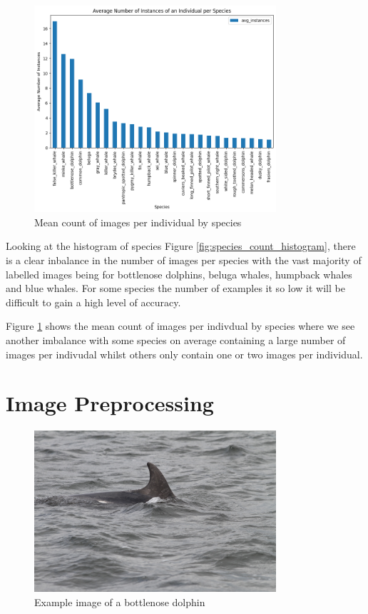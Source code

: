 \documentclass{article}
\begin{document}
\begin{figure}[!htb]
    \centering
    \includegraphics[width=0.8\textwidth]{mean_individuals_histogram.png}
    \caption{Mean count of images per individual by species}
    \label{fig:individual_mean_count_histogram}
\end{figure}

Looking at the histogram of species Figure \ref{fig:species_count_histogram}, there is a clear inbalance in the number of images per species with the vast majority
of labelled images being for bottlenose dolphins, beluga whales, humpback whales and blue whales. For some species the number of examples it so low it will be difficult to gain a high level of accuracy.

Figure \ref{fig:individual_mean_count_histogram} shows the mean count of images per indivdual by species where we see another imbalance with some species on average containing a large number of images per indivudal whilst others only contain one or two images per individual.


\section{Image Preprocessing}

\begin{figure}
    \centering
    \includegraphics[width=0.8\textwidth]{example_train.jpg}
    \caption{Example image of a bottlenose dolphin}
    \label{fig:example_train}
\end{figure}
\end{document}
